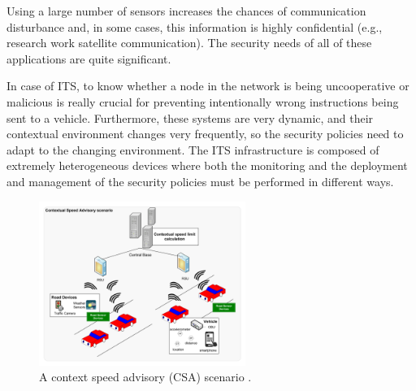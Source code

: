 \documentclass[12pt,a4paper,twoside]{report}
\begin{document}
Using a large number of sensors increases the chances of communication disturbance and, in some cases, this information is highly confidential (e.g., research work satellite communication). The security needs of all of these applications are quite significant. \par
In case of ITS, to know whether a node in the network is being uncooperative or malicious is really crucial for preventing intentionally wrong instructions being sent to a vehicle. Furthermore, these systems are very dynamic, and their contextual environment changes very frequently, so the security policies need to adapt to the changing environment. The ITS infrastructure is composed of extremely heterogeneous devices where both the monitoring and the deployment and management of the security policies must be performed in different ways.
\begin{figure}[ht]
	\begin{center}
  \includegraphics[width=0.6\textwidth,natwidth=652,natheight=510]{./figures/figure-01.png}
  \end{center}
  \caption{A context speed advisory (CSA) scenario \cite{Pinto;etal:2013}.}
  \label{fig:01}
\end{figure}
\end{document}
